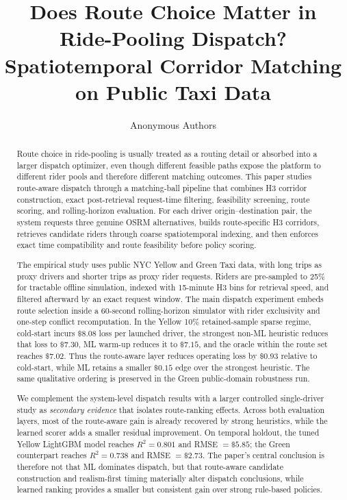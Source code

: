 \documentclass[journal]{IEEEtran}
\title{Does Route Choice Matter in Ride-Pooling Dispatch?\\Spatiotemporal Corridor Matching on Public Taxi Data}
\author{Anonymous Authors}
\begin{document}
\maketitle
\vspace{-1.0em}

\begin{abstract}
Route choice in ride-pooling is usually treated as a routing detail or absorbed into a larger dispatch optimizer, even though different feasible paths expose the platform to different rider pools and therefore different matching outcomes. This paper studies route-aware dispatch through a matching-ball pipeline that combines H3 corridor construction, exact post-retrieval request-time filtering, feasibility screening, route scoring, and rolling-horizon evaluation. For each driver origin--destination pair, the system requests three genuine OSRM alternatives, builds route-specific H3 corridors, retrieves candidate riders through coarse spatiotemporal indexing, and then enforces exact time compatibility and route feasibility before policy scoring.

The empirical study uses public NYC Yellow and Green Taxi data, with long trips as proxy drivers and shorter trips as proxy rider requests. Riders are pre-sampled to 25\% for tractable offline simulation, indexed with 15-minute H3 bins for retrieval speed, and filtered afterward by an exact request window. The main dispatch experiment embeds route selection inside a 60-second rolling-horizon simulator with rider exclusivity and one-step conflict recomputation. In the Yellow 10\% retained-sample sparse regime, cold-start incurs \(\$8.08\) loss per launched driver, the strongest non-ML heuristic reduces that loss to \(\$7.30\), ML warm-up reduces it to \(\$7.15\), and the oracle within the route set reaches \(\$7.02\). Thus the route-aware layer reduces operating loss by \(\$0.93\) relative to cold-start, while ML retains a smaller \(\$0.15\) edge over the strongest heuristic. The same qualitative ordering is preserved in the Green public-domain robustness run.

We complement the system-level dispatch results with a larger controlled single-driver study as \emph{secondary evidence} that isolates route-ranking effects. Across both evaluation layers, most of the route-aware gain is already recovered by strong heuristics, while the learned scorer adds a smaller residual improvement. On temporal holdout, the tuned Yellow LightGBM model reaches \(R^2=0.801\) and RMSE \(=\$5.85\); the Green counterpart reaches \(R^2=0.738\) and RMSE \(=\$2.73\). The paper's central conclusion is therefore not that ML dominates dispatch, but that route-aware candidate construction and realism-first timing materially alter dispatch conclusions, while learned ranking provides a smaller but consistent gain over strong rule-based policies.
\end{abstract}
\end{document}
